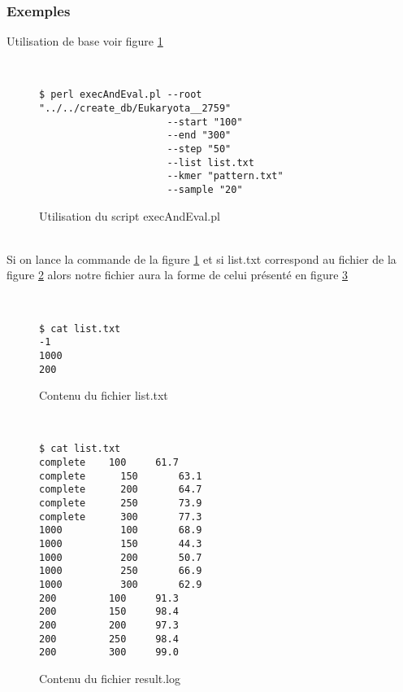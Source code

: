 \subsubsection{Exemples}
Utilisation de base voir figure \ref{crossV}

~\\
\begin{figure}[H]
\begin{center}
\begin{verbatim}
$ perl execAndEval.pl --root "../../create_db/Eukaryota__2759" 
                      --start "100" 
                      --end "300" 
                      --step "50" 
                      --list list.txt 
                      --kmer "pattern.txt" 
                      --sample "20"
\end{verbatim}
\end{center}
\caption{\label{crossV}Utilisation du script execAndEval.pl}
\end{figure}
~\\

Si on lance la commande de la figure \ref{crossV} et si list.txt correspond au fichier de la figure \ref{fileList}
alors notre fichier aura la forme de celui présenté en figure \ref{resultlog}

~\\
\begin{figure}[H]
\begin{center}

\begin{verbatim}
$ cat list.txt
-1
1000
200
\end{verbatim}
\end{center}
\caption{\label{fileList}Contenu du fichier list.txt}
\end{figure}
~\\

\begin{figure}[H]
\begin{verbatim}
$ cat list.txt
complete    100	    61.7
complete	  150	    63.1
complete	  200	    64.7
complete	  250	    73.9
complete	  300	    77.3
1000	      100	    68.9
1000	      150	    44.3
1000	      200	    50.7
1000	      250	    66.9
1000	      300	    62.9
200	        100	    91.3
200	        150	    98.4
200	        200	    97.3
200	        250	    98.4
200	        300	    99.0

\end{verbatim}
\begin{center}

\end{center}
\caption{\label{resultlog}Contenu du fichier result.log}
\end{figure}
~\\



